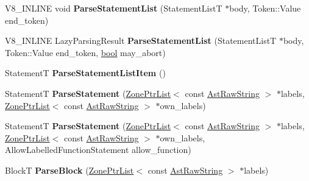 \begin{DoxyCompactItemize}
\item 
\mbox{\label{classv8_1_1internal_1_1ParserBase_a61a39f1bc9c26d8c1c0c2059b18b318f}} 
V8\+\_\+\+I\+N\+L\+I\+NE void {\bfseries Parse\+Statement\+List} (Statement\+ListT $\ast$body, Token\+::\+Value end\+\_\+token)
\item 
\mbox{\label{classv8_1_1internal_1_1ParserBase_a28e26b121ab69f73cbf1a3383050ada8}} 
V8\+\_\+\+I\+N\+L\+I\+NE Lazy\+Parsing\+Result {\bfseries Parse\+Statement\+List} (Statement\+ListT $\ast$body, Token\+::\+Value end\+\_\+token, \mbox{\hyperlink{classbool}{bool}} may\+\_\+abort)
\item 
\mbox{\label{classv8_1_1internal_1_1ParserBase_a494c4e099ec8ae09b6e5f0b3743f0b2c}} 
StatementT {\bfseries Parse\+Statement\+List\+Item} ()
\item 
\mbox{\label{classv8_1_1internal_1_1ParserBase_a7fda2f9605a6e9e0aa1ac90ae0f81d8d}} 
StatementT {\bfseries Parse\+Statement} (\mbox{\hyperlink{classv8_1_1internal_1_1ZoneList}{Zone\+Ptr\+List}}$<$ const \mbox{\hyperlink{classv8_1_1internal_1_1AstRawString}{Ast\+Raw\+String}} $>$ $\ast$labels, \mbox{\hyperlink{classv8_1_1internal_1_1ZoneList}{Zone\+Ptr\+List}}$<$ const \mbox{\hyperlink{classv8_1_1internal_1_1AstRawString}{Ast\+Raw\+String}} $>$ $\ast$own\+\_\+labels)
\item 
\mbox{\label{classv8_1_1internal_1_1ParserBase_ad22534f7949f164fbed636190134e44f}} 
StatementT {\bfseries Parse\+Statement} (\mbox{\hyperlink{classv8_1_1internal_1_1ZoneList}{Zone\+Ptr\+List}}$<$ const \mbox{\hyperlink{classv8_1_1internal_1_1AstRawString}{Ast\+Raw\+String}} $>$ $\ast$labels, \mbox{\hyperlink{classv8_1_1internal_1_1ZoneList}{Zone\+Ptr\+List}}$<$ const \mbox{\hyperlink{classv8_1_1internal_1_1AstRawString}{Ast\+Raw\+String}} $>$ $\ast$own\+\_\+labels, Allow\+Labelled\+Function\+Statement allow\+\_\+function)
\item 
\mbox{\label{classv8_1_1internal_1_1ParserBase_aafbc4d1ba3c7c9e52dcae42c8927da8c}} 
BlockT {\bfseries Parse\+Block} (\mbox{\hyperlink{classv8_1_1internal_1_1ZoneList}{Zone\+Ptr\+List}}$<$ const \mbox{\hyperlink{classv8_1_1internal_1_1AstRawString}{Ast\+Raw\+String}} $>$ $\ast$labels)

\end{DoxyCompactItemize}
